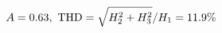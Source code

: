 \documentclass[preview]{standalone}
\begin{document}
\begin{align*}
\special{dvisvgm:raw <g id='unique000'>}A=0.63,\ \text{THD}=\sqrt{H_2^2+H_3^2}/H_1=11.9\%\special{dvisvgm:raw </g>}
\end{align*}
\end{document}
